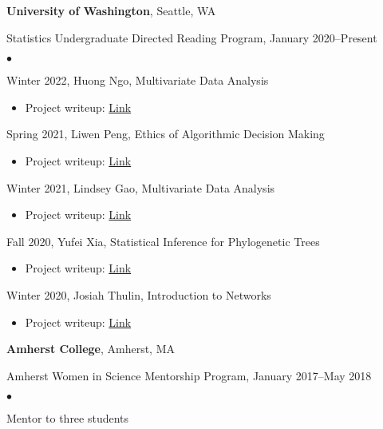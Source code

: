 \documentclass[margin,centered]{res}
\newenvironment{list1}{
  \begin{list}{\ding{113}}{%
      \setlength{\itemsep}{0in}
      \setlength{\parsep}{0in} \setlength{\parskip}{0in}
      \setlength{\topsep}{0in} \setlength{\partopsep}{0in}
      \setlength{\leftmargin}{0.17in}}}{\end{list}}
\newenvironment{list2}{
  \begin{list}{$\bullet$}{%
      \setlength{\itemsep}{0in}
      \setlength{\parsep}{0in} \setlength{\parskip}{0in}
      \setlength{\topsep}{0in} \setlength{\partopsep}{0in}
      \setlength{\leftmargin}{0.2in}}}{\end{list}}
\begin{document}
\begin{resume}
{\bf University of Washington}, Seattle, WA
\begin{list1}
\item[] Statistics Undergraduate Directed Reading Program, January 2020--Present
\begin{list2}
\vspace*{.05in}
\item Winter 2022, Huong Ngo, Multivariate Data Analysis
\begin{itemize}
\item Project writeup: \href{https://spa-drp.github.io/writeups/win2022/writeups/huong.pdf}{Link}
\end{itemize}
\item Spring 2021, Liwen Peng, Ethics of Algorithmic Decision Making
\begin{itemize}
\item Project writeup: \href{https://spa-drp.github.io/writeups/spring2021/liwen_writeup.pdf}{Link}
\end{itemize}
\item Winter 2021, Lindsey Gao, Multivariate Data Analysis
\begin{itemize}
\item Project writeup: \href{https://spa-drp.github.io/writeups/win2021/lindsey_writeup.pdf}{Link}
\end{itemize}
\item Fall 2020, Yufei Xia, Statistical Inference for Phylogenetic Trees
\begin{itemize}
\item Project writeup: \href{https://spa-drp.github.io/writeups/aut2020/lexi-writeup.pdf}{Link}
\end{itemize}
\item Winter 2020, Josiah Thulin, Introduction to Networks
\begin{itemize} 
\item Project writeup: \href{https://spa-drp.github.io/writeups/win2020/josiah.pdf}{Link}
\end{itemize}
\end{list2}
\end{list1}

{\bf Amherst College}, Amherst, MA
\begin{list1}
\item[] Amherst Women in Science Mentorship Program, January 2017--May 2018 
\begin{list2}
\vspace*{.05in}
\item Mentor to three students 
\end{list2}
\end{list1}






\end{resume}
\end{document}
